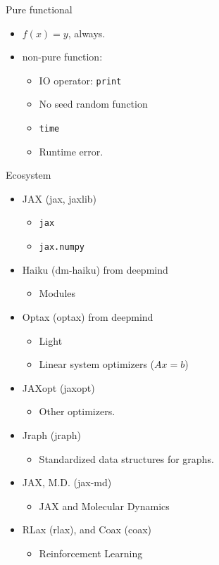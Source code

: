 \documentclass[aspectratio=1610,xcolor={dvipsnames},hyperref={colorlinks,unicode,linkcolor=violet,anchorcolor=BlueViolet,citecolor=YellowOrange,filecolor=black,urlcolor=Aquamarine}]{beamer}
\begin{document}
\begin{frame}[label={sec:orgb43aadd},fragile]{Pure functional}
 \begin{itemize}
\item \(f(x) = y\), always.
\item non-pure function:
\begin{itemize}
\item IO operator: \texttt{print}
\item No seed random function
\item \texttt{time}
\item Runtime error.
\end{itemize}
\end{itemize}
\end{frame}

\begin{frame}[label={sec:orgcbd9332},fragile]{Ecosystem}
 \begin{itemize}
\item JAX (jax, jaxlib)
\begin{itemize}
\item \texttt{jax}
\item \texttt{jax.numpy}
\end{itemize}
\item Haiku (dm-haiku) from deepmind
\begin{itemize}
\item Modules
\end{itemize}
\item Optax (optax) from deepmind
\begin{itemize}
\item Light
\item Linear system optimizers (\(Ax = b\))
\end{itemize}
\item JAXopt (jaxopt)
\begin{itemize}
\item Other optimizers.
\end{itemize}
\item Jraph (jraph)
\begin{itemize}
\item Standardized data structures for graphs.
\end{itemize}
\item JAX, M.D. (jax-md)
\begin{itemize}
\item JAX and Molecular Dynamics
\end{itemize}
\item RLax (rlax), and Coax (coax)
\begin{itemize}
\item Reinforcement Learning
\end{itemize}
\end{itemize}
\end{frame}
\end{document}
